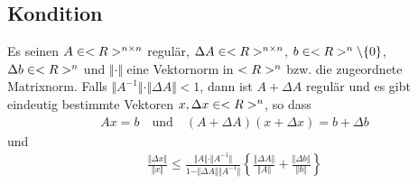 \subsection{Kondition}

\begin{proposition}
	Es seinen $A\in<R>^{n\times n}$ regulär, $\Delta A\in<R>^{n\times n}$, $b\in<R>^n\backslash\{0\}$, $\Delta b\in<R>^n$ und $\Vert\cdot\Vert$ eine Vektornorm in $<R>^n$ bzw. die zugeordnete Matrixnorm. Falls $\Vert A^{-1}\Vert\cdot \Vert\Delta A\Vert<1$, dann ist $A+\Delta A$ regulär und es gibt eindeutig bestimmte Vektoren $x,\Delta x\in<R>^n$, so dass
	\begin{align}
		\label{3.18}
		Ax=b\quad\text{und}\quad (A+\Delta A)(x+\Delta x)=b+\Delta b
	\end{align}
	und
	\begin{align}
		\label{3.19}
		\frac{\Vert\Delta x\Vert}{\Vert x\Vert} \le \frac{\Vert A\Vert\cdot\Vert A^{-1}\Vert}{1-\Vert\Delta A\Vert\Vert A^{-1}\Vert}\left\lbrace \frac{\Vert\Delta A\Vert}{\Vert A\Vert} + \frac{\Vert \Delta b\Vert}{\Vert b\Vert}\right\rbrace  
	\end{align}
\end{proposition}
